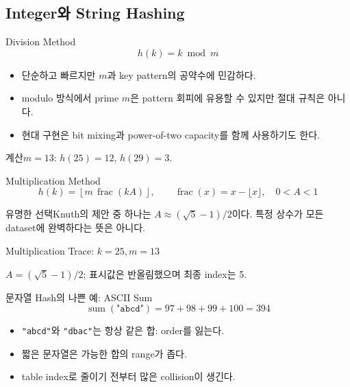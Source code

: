 \subsection{Integer와 String Hashing}
\begin{frame}{Division Method}
\[
h(k)=k\bmod m
\]
\begin{itemize}\item 단순하고 빠르지만 $m$과 key pattern의 공약수에 민감하다.\item modulo 방식에서 prime $m$은 pattern 회피에 유용할 수 있지만 절대 규칙은 아니다.\item 현대 구현은 bit mixing과 power-of-two capacity를 함께 사용하기도 한다.\end{itemize}
\begin{exampleblock}{계산}$m=13$: $h(25)=12$, $h(29)=3$.\end{exampleblock}
\end{frame}
\begin{frame}{Multiplication Method}
\[
h(k)=\left\lfloor m\,\operatorname{frac}(kA)\right\rfloor,\qquad
\operatorname{frac}(x)=x-\lfloor x\rfloor,\quad 0<A<1
\]
\begin{block}{유명한 선택}Knuth의 제안 중 하나는 $A\approx(\sqrt5-1)/2$이다. 특정 상수가 모든 dataset에 완벽하다는 뜻은 아니다.\end{block}
\end{frame}
\begin{frame}{Multiplication Trace: \texorpdfstring{$k=25,m=13$}{k=25,m=13}}
\centering
{}
\begin{center}\small $A=(\sqrt5-1)/2$; 표시값은 반올림했으며 최종 index는 5.\end{center}
\end{frame}
\begin{frame}{문자열 Hash의 나쁜 예: ASCII Sum}
\[
\operatorname{sum}(\texttt{"abcd"})=97+98+99+100=394
\]
\begin{itemize}\item \texttt{"abcd"}와 \texttt{"dbac"}는 항상 같은 합: order를 잃는다.\item 짧은 문자열은 가능한 합의 range가 좁다.\item table index로 줄이기 전부터 많은 collision이 생긴다.\end{itemize}
\end{frame}
